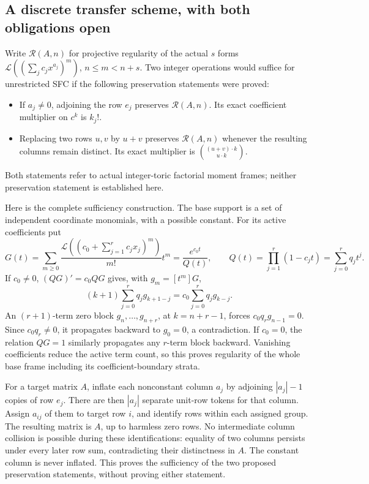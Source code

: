 \documentclass[11pt]{article}
\newcommand{\Lfac}{\mathcal L}
\begin{document}
\subsection{A discrete transfer scheme, with both obligations open}
Write $\mathcal R(A,n)$ for projective regularity of the actual $s$
forms $\Lfac((\sum_jc_jx^{a_j})^m)$, $n\le m<n+s$.
Two integer operations would suffice for unrestricted SFC if the
following preservation statements were proved:
\begin{itemize}
\item If $a_j\ne0$, adjoining the row $e_j$ preserves $\mathcal R(A,n)$.
Its exact coefficient multiplier on $c^k$ is $k_j!$.
\item Replacing two rows $u,v$ by $u+v$ preserves $\mathcal R(A,n)$
whenever the resulting columns remain distinct. Its exact multiplier is
$\binom{(u+v)\cdot k}{u\cdot k}$.
\end{itemize}
Both statements refer to actual integer-toric factorial moment frames;
neither preservation statement is established here.

Here is the complete sufficiency construction. The base support is a
set of independent coordinate monomials, with a possible constant.
For its active coefficients put
\[
 G(t)=\sum_{m\ge0}\frac{\Lfac((c_0+\sum_{j=1}^r c_jx_j)^m)}{m!}t^m
      =\frac{e^{c_0t}}{Q(t)},\qquad
 Q(t)=\prod_{j=1}^r(1-c_jt)=\sum_{j=0}^r q_jt^j.
\]
If $c_0\ne0$, $(QG)'=c_0QG$ gives, with $g_m=[t^m]G$,
\[
 (k+1)\sum_{j=0}^r q_jg_{k+1-j}
     =c_0\sum_{j=0}^r q_jg_{k-j}.
\]
An $(r+1)$-term zero block $g_n,\ldots,g_{n+r}$, at
$k=n+r-1$, forces $c_0q_rg_{n-1}=0$. Since $c_0q_r\ne0$,
it propagates backward to $g_0=0$, a contradiction.
If $c_0=0$, the relation $QG=1$ similarly propagates any $r$-term
block backward. Vanishing coefficients reduce the active term count,
so this proves regularity of the whole base frame including its
coefficient-boundary strata.

For a target matrix $A$, inflate each nonconstant column $a_j$ by
adjoining $|a_j|-1$ copies of row $e_j$. There are then $|a_j|$
separate unit-row tokens for that column. Assign $a_{ij}$ of them to
target row $i$, and identify rows within each assigned group.
The resulting matrix is $A$, up to harmless zero rows.
No intermediate column collision is possible during these identifications:
equality of two columns persists under every later row sum, contradicting
their distinctness in $A$. The constant column is never inflated.
This proves the sufficiency of the two proposed preservation statements,
without proving either statement.
\end{document}
